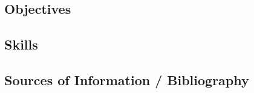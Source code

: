 \documentclass[../CHEFCookingHelperForEveryonesFridge.tex]{subfiles}
\begin{document}
\subsection{Objectives}

\subsection{Skills}

\subsection{Sources of Information / Bibliography}
\end{document}
